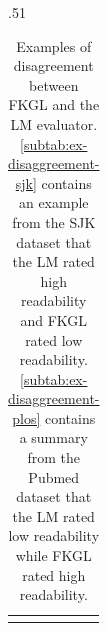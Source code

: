 \begin{table}[!t]
\begin{subtable}[t]{.51\textwidth}
\begin{tabular}{p{}}
{        %
        }
        \end{tabular}
        \caption{FKGL = 10.0 (10th grade), \\LM score = 1/5.}
        \label{subtab:ex-disaggreement-plos}
    \end{subtable} 
    \caption[Examples of disagreement between FKGL and the LM evaluator.]{Examples of disagreement between FKGL and the LM evaluator. \ref{subtab:ex-disaggreement-sjk} contains an example from the SJK dataset that the LM rated high readability and FKGL rated low readability. \ref{subtab:ex-disaggreement-plos} contains a summary from the Pubmed dataset that the LM rated low readability while FKGL rated high readability.}
    \label{tab:disagreement-example}
\end{table}